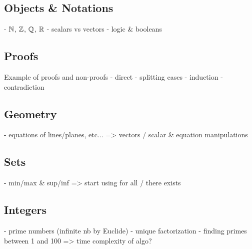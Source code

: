 \subsection{Objects \& Notations}

- $\mathbb{N}$, $\mathbb{Z}$, $\mathbb{Q}$, $\mathbb{R}$
- scalars vs vectors
- logic \& booleans
\subsection{Proofs}
Example of proofs and non-proofs
- direct
- splitting cases
- induction
- contradiction
\subsection{Geometry}
- equations of lines/planes, etc... => vectors / scalar \& equation manipulations
\subsection{Sets}
- min/max \& sup/inf => start using for all / there exists
\subsection{Integers}
- prime numbers (infinite nb by Euclide)
- unique factorization 
- finding primes between 1 and 100 => time complexity of algo?